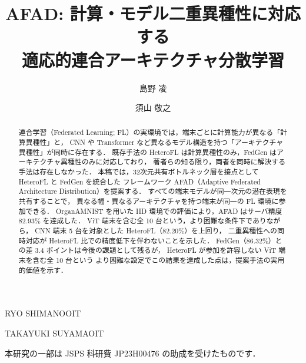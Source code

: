 \documentclass[Japanese,noauthor]{dicomopapers}
\begin{document}
\title{AFAD: 計算・モデル二重異種性に対応する\\適応的連合アーキテクチャ分散学習}




\author{島野 凌}{RYO SHIMANO}{OIT}
\author{須山 敬之}{TAKAYUKI SUYAMA}{OIT}

\begin{abstract}
  連合学習（Federated Learning; FL）の実環境では，端末ごとに計算能力が異なる「計算異種性」と，
  CNN や Transformer など異なるモデル構造を持つ「アーキテクチャ異種性」が同時に存在する．
  既存手法の HeteroFL は計算異種性のみ，FedGen はアーキテクチャ異種性のみに対応しており，
  著者らの知る限り，両者を同時に解決する手法は存在しなかった．
  本稿では，32次元共有ボトルネック層を接点として HeteroFL と FedGen を統合した
  フレームワーク AFAD（Adaptive Federated Architecture Distribution）を提案する．
  すべての端末モデルが同一次元の潜在表現を共有することで，
  異なる幅・異なるアーキテクチャを持つ端末が同一の FL 環境に参加できる．
  OrganAMNIST を用いた IID 環境での評価により，AFAD はサーバ精度 82.93\% を達成した．
  ViT 端末を含む全 10 台という，より困難な条件下でありながら，
  CNN 端末 5 台を対象とした HeteroFL（82.20\%）を上回り，
  二重異種性への同時対応が HeteroFL 比での精度低下を伴わないことを示した．
  FedGen（86.32\%）との差 3.4 ポイントは今後の課題として残るが，
  HeteroFL が参加を許容しない ViT 端末を含む全 10 台という
  より困難な設定でこの結果を達成した点は，提案手法の実用的価値を示す．
\end{abstract}

\maketitle









\begin{acknowledgment}
本研究の一部は JSPS 科研費 JP23H00476 の助成を受けたものです．
\end{acknowledgment}



\end{document}
